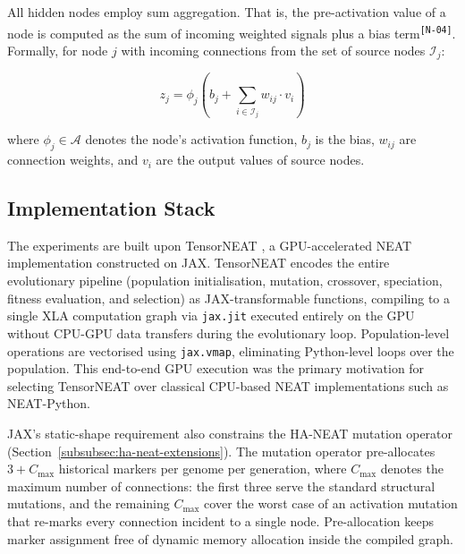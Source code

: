 \documentclass[12pt]{article}
\newcommand{\revID}[1]{\textsuperscript{\scriptsize\texttt{[#1]}}}
\newcommand{\revNota}[2]{\textcolor{lrViolet}{#2}\revID{#1}}    %
\begin{document}

All hidden nodes employ sum aggregation.
That is, \revNota{N-04}{the pre-activation value of a node is computed as the sum of incoming weighted signals plus a bias term}.
Formally, for node $j$ with incoming connections from the set of source nodes $\mathcal{I}_j$:

\[z_j = \phi_j\left(b_j + \sum_{i \in \mathcal{I}_j} w_{ij} \cdot v_i\right)\]

where $\phi_j \in \mathcal{A}$ denotes the node's activation function, $b_j$ is the bias, $w_{ij}$ are connection weights, and $v_i$ are the output values of source nodes.

\subsection{Implementation Stack}
\label{subsec:implementation-stack}

The experiments are built upon TensorNEAT \parencite{wang_tensorized_2024}, a GPU-accelerated NEAT implementation constructed on JAX.
TensorNEAT encodes the entire evolutionary pipeline (population initialisation, mutation, crossover, speciation, fitness evaluation, and selection) as JAX-transformable functions, compiling to a single XLA computation graph via \texttt{jax.jit} executed entirely on the GPU without CPU-GPU data transfers during the evolutionary loop.
Population-level operations are vectorised using \texttt{jax.vmap}, eliminating Python-level loops over the population.
This end-to-end GPU execution was the primary motivation for selecting TensorNEAT over classical CPU-based NEAT implementations such as NEAT-Python.

JAX's static-shape requirement also constrains the HA-NEAT mutation operator (Section~\ref{subsubsec:ha-neat-extensions}).
The mutation operator pre-allocates $3 + C_{\max}$ historical markers per genome per generation, where $C_{\max}$ denotes the maximum number of connections: the first three serve the standard structural mutations, and the remaining $C_{\max}$ cover the worst case of an activation mutation that re-marks every connection incident to a single node.
Pre-allocation keeps marker assignment free of dynamic memory allocation inside the compiled graph.
\end{document}
